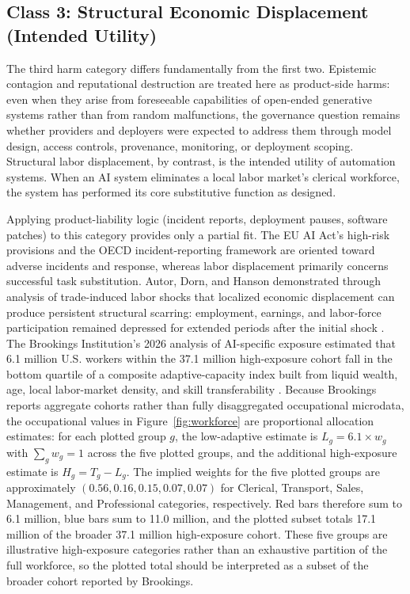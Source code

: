 \documentclass[11pt]{article}
\begin{document}
\subsection{Class 3: Structural Economic Displacement (Intended Utility)}

The third harm category differs fundamentally from the first two. Epistemic contagion and reputational destruction are treated here as product-side harms: even when they arise from foreseeable capabilities of open-ended generative systems rather than from random malfunctions, the governance question remains whether providers and deployers were expected to address them through model design, access controls, provenance, monitoring, or deployment scoping. Structural labor displacement, by contrast, is the intended utility of automation systems. When an AI system eliminates a local labor market's clerical workforce, the system has performed its core substitutive function as designed.

Applying product-liability logic (incident reports, deployment pauses, software patches) to this category provides only a partial fit. The EU AI Act's high-risk provisions and the OECD incident-reporting framework are oriented toward adverse incidents and response, whereas labor displacement primarily concerns successful task substitution. Autor, Dorn, and Hanson demonstrated through analysis of trade-induced labor shocks that localized economic displacement can produce persistent structural scarring: employment, earnings, and labor-force participation remained depressed for extended periods after the initial shock \parencite{autor2013}. The Brookings Institution's 2026 analysis of AI-specific exposure estimated that 6.1 million U.S. workers within the 37.1 million high-exposure cohort fall in the bottom quartile of a composite adaptive-capacity index built from liquid wealth, age, local labor-market density, and skill transferability \parencite{brookings2026}. Because Brookings reports aggregate cohorts rather than fully disaggregated occupational microdata, the occupational values in Figure~\ref{fig:workforce} are proportional allocation estimates: for each plotted group $g$, the low-adaptive estimate is $L_g = 6.1 \times w_g$ with $\sum_g w_g = 1$ across the five plotted groups, and the additional high-exposure estimate is $H_g = T_g - L_g$. The implied weights for the five plotted groups are approximately $(0.56, 0.16, 0.15, 0.07, 0.07)$ for Clerical, Transport, Sales, Management, and Professional categories, respectively. Red bars therefore sum to 6.1 million, blue bars sum to 11.0 million, and the plotted subset totals 17.1 million of the broader 37.1 million high-exposure cohort. These five groups are illustrative high-exposure categories rather than an exhaustive partition of the full workforce, so the plotted total should be interpreted as a subset of the broader cohort reported by Brookings.
\end{document}
